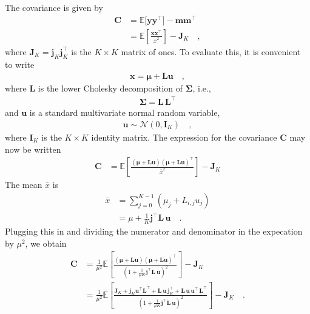 \documentclass[modern]{aastex62}
\begin{document}
The covariance is given by
%
\begin{align}
    \mathbf{C}
     & =
    \mathbb{E}\big[ \mathbf{y} \mathbf{y}^\top \big]
    - \mathbf{m}\mathbf{m}^\top
    \nonumber \\[0.5em]
     & =
    \mathbb{E}\left[ \frac{\mathbf{x}\mathbf{x}^\top}{\bar{x}^2} \right]
    - \mathbf{J}_K
    \quad,
\end{align}
%
where $\mathbf{J}_K = \mathbf{j}_K \mathbf{j}_K^\top$ is the $K\times K$ matrix of ones.
To evaluate this, it is convenient to write
%
\begin{align}
    \mathbf{x} = \pmb{\mu} + \mathbf{L} \mathbf{u}
    \quad,
\end{align}
%
where $\mathbf{L}$ is the lower Cholesky decomposition of $\pmb{\Sigma}$,
i.e.,
%
\begin{align}
    \pmb{\Sigma} = \mathbf{L}\,\mathbf{L}^\top
\end{align}
%
and $\mathbf{u}$ is a standard multivariate normal random variable,
%
\begin{align}
    \mathbf{u} \sim \mathcal{N}\left( 0, \mathbf{I}_K \right)
    \quad,
\end{align}
%
where $\mathbf{I}_K$ is the
$K \times K$ identity matrix.
The expression for the covariance $\mathbf{C}$ may now be written
%
\begin{align}
    \mathbf{C}
     & =
    \mathbb{E}\left[
        \frac{
            (\pmb{\mu} + \mathbf{L} \mathbf{u})(\pmb{\mu} + \mathbf{L} \mathbf{u})^\top
        }{
            \bar{x}^2
        }
        \right]
    - \mathbf{J}_K
\end{align}
%
The mean $\bar{x}$ is
%
\begin{align}
    \bar{x} & = \sum\limits_{j=0}^{K-1}(\mu_j + L_{i,j}u_j)
    \nonumber                                               \\
            & =
    \mu + \frac{1}{K}\mathbf{j}^\top \mathbf{L} \, \mathbf{u}
    \quad.
\end{align}
%
Plugging this in and dividing the numerator and denominator in the expecation
by $\mu^2$, we obtain
%
\begin{align}
    \mathbf{C}
     & =
    \frac{1}{\mu^2}
    \mathbb{E}\left[
        \frac{
            (\pmb{\mu} + \mathbf{L} \mathbf{u})(\pmb{\mu} + \mathbf{L} \mathbf{u})^\top
        }{
            \left(1 + \frac{1}{\mu K}\mathbf{j}^\top \mathbf{L} \, \mathbf{u}\right)^2
        }
        \right]
    - \mathbf{J}_K
    \nonumber \\[0.5em]
     & =
    \frac{1}{\mu^2}
    \mathbb{E}\left[
        \frac{
            \mathbf{J}_K
            +
            \mathbf{j}_K\mathbf{u}^\top \mathbf{L}^\top
            +
            \mathbf{L} \, \mathbf{u} \, \mathbf{j}_K^\top
            +
            \mathbf{L} \, \mathbf{u} \, \mathbf{u}^\top \, \mathbf{L}^\top
        }{
            \left(1 + \frac{1}{\mu K}\mathbf{j}^\top \mathbf{L} \, \mathbf{u}\right)^2
        }
        \right]
    - \mathbf{J}_K
    \quad.
\end{align}
\end{document}
